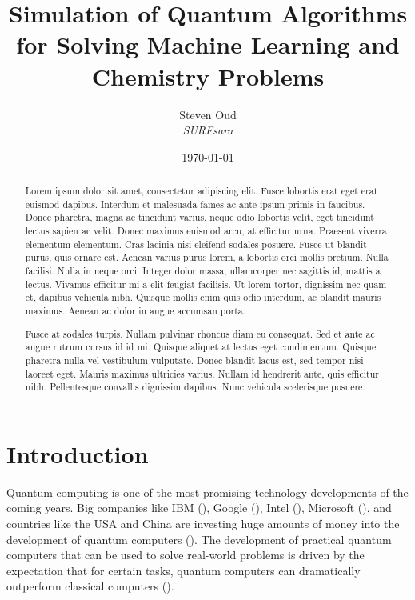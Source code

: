 \documentclass[a4paper,10pt]{article}
\title{Simulation of Quantum Algorithms for Solving Machine Learning and Chemistry Problems}
\author{Steven Oud \\ \emph{SURFsara}}
\date{\today}
\begin{document}
\maketitle

\begin{abstract}
Lorem ipsum dolor sit amet, consectetur adipiscing elit. Fusce lobortis erat eget erat euismod dapibus. Interdum et malesuada fames ac ante ipsum primis in faucibus. Donec pharetra, magna ac tincidunt varius, neque odio lobortis velit, eget tincidunt lectus sapien ac velit. Donec maximus euismod arcu, at efficitur urna. Praesent viverra elementum elementum. Cras lacinia nisi eleifend sodales posuere. Fusce ut blandit purus, quis ornare est. Aenean varius purus lorem, a lobortis orci mollis pretium. Nulla facilisi. Nulla in neque orci. Integer dolor massa, ullamcorper nec sagittis id, mattis a lectus. Vivamus efficitur mi a elit feugiat facilisis. Ut lorem tortor, dignissim nec quam et, dapibus vehicula nibh. Quisque mollis enim quis odio interdum, ac blandit mauris maximus. Aenean ac dolor in augue accumsan porta.

Fusce at sodales turpis. Nullam pulvinar rhoncus diam eu consequat. Sed et ante ac augue rutrum cursus id id mi. Quisque aliquet at lectus eget condimentum. Quisque pharetra nulla vel vestibulum vulputate. Donec blandit lacus est, sed tempor nisi laoreet eget. Mauris maximus ultricies varius. Nullam id hendrerit ante, quis efficitur nibh. Pellentesque convallis dignissim dapibus. Nunc vehicula scelerisque posuere.
\end{abstract}

\newpage

\tableofcontents

\newpage

\section{Introduction}
Quantum computing is one of the most promising technology developments of the coming years.
Big companies like IBM (\cite{ibm-quantum}), Google (\cite{google-quantum}), Intel (\cite{intel-quantum}), Microsoft (\cite{microsoft-quantum}), and countries like the USA and China are investing huge amounts of money into the development of quantum computers (\cite{usa-quantum, china-quantum}).
The development of practical quantum computers that can be used to solve real-world problems is driven by the expectation that for certain tasks, quantum computers can dramatically outperform classical computers (\cite{preskill-qc}).
\end{document}
